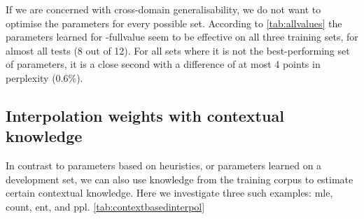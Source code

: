 If we are concerned with cross-domain generalisability, we do not want to optimise the parameters for every possible set. According to \cref{tab:allvalues} the parameters learned for \wp-\textsf{fullvalue} seem to be effective on all three training sets, for almost all tests (8 out of 12). For all sets where it is not the best-performing set of parameters, it is a close second with a difference of at most 4 points in perplexity (0.6\%). 

\subsection{Interpolation weights with contextual knowledge}
In contrast to parameters based on heuristics, or parameters learned on a development set, we can also use knowledge from the training corpus to estimate certain contextual knowledge. Here we investigate three such examples: \textsf{mle}, \textsf{count}, \textsf{ent}, and \textsf{ppl}. \cref{tab:contextbasedinterpol}

